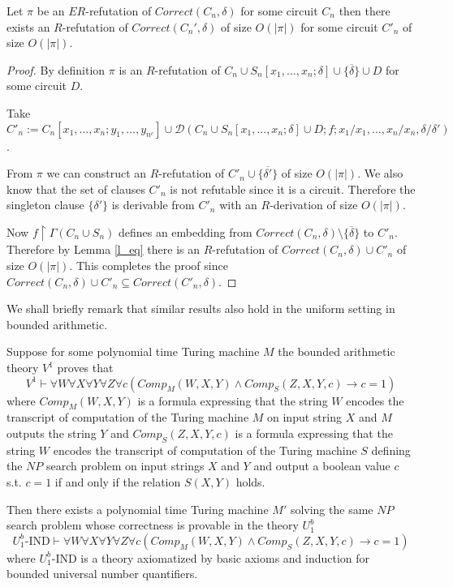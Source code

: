 \documentclass{LMCS}
\theoremstyle{plain}\newtheorem{satz}[thm]{Satz}
\begin{document}
\begin{lem}
\label{t_c}
Let $\pi$ be an $ER$-refutation of $Correct(C_n,\delta)$ for some circuit $C_n$ then there exists an $R$-refutation of $Correct(C_n',\delta)$ of size $O(|\pi|)$ for some circuit $C'_n$ of size $O(|\pi|)$.
\end{lem}
\begin{proof}
By definition $\pi$ is an $R$-refutation of $C_n \cup S_n [x_1,...,x_n;\delta] \cup \{\overline{\delta}\} \cup D$ for some circuit $D$.

Take $C'_n := C_n[x_1,...,x_n;y_1,...,y_{n^c}] \cup {\mathcal D}(C_n \cup S_n [x_1,...,x_n;\delta] \cup D;f;x_1/x_1,...,x_n/x_n,\delta/\delta')$.

From $\pi$ we can construct an $R$-refutation of $C'_n \cup \{ \overline{\delta'}\}$ of size $O(|\pi|)$. We also know that the set of clauses $C'_n$ is not refutable since it is a circuit. Therefore the singleton clause $\{\delta'\}$ is derivable from $C'_n$ with an $R$-derivation of size $O(|\pi|)$.

Now $f \restriction \Gamma(C_n \cup S_n)$ defines an embedding from $Correct(C_n,\delta) \setminus \{ \overline{\delta} \}$ to $C'_n$. Therefore by Lemma \ref{l_eq} there is an $R$-refutation of $Correct(C_n,\delta) \cup C'_n$ of size $O(|\pi|)$. This completes the proof since $Correct(C_n,\delta) \cup C'_ n \subseteq Correct(C'_n,\delta)$.
\end{proof}

We shall briefly remark that similar results also hold in the uniform setting in bounded arithmetic.

Suppose for some polynomial time Turing machine $M$ the bounded arithmetic theory $V^1$ proves that
\begin{equation*}
V^1 \vdash \forall W \forall X \forall Y \forall Z \forall c (Comp_M(W,X,Y) \land Comp_S(Z,X,Y,c) \to c=1)
\end{equation*}
where $Comp_M(W,X,Y)$ is a formula expressing that the string $W$ encodes the transcript of computation of the Turing machine $M$ on input string $X$ and $M$ outputs the string $Y$ and $Comp_S(Z,X,Y,c)$ is a formula expressing that the string $W$ encodes the transcript of computation of the Turing machine $S$ defining the $NP$ search problem on input strings $X$ and $Y$ and output a boolean value $c$ s.t. $c=1$ if and only if the relation $S(X,Y)$ holds.

Then there exists a polynomial time Turing machine $M'$ solving the same $NP$ search problem whose correctness is provable in the theory $U^b_1$
\begin{equation*}
U^b_1\text{-IND} \vdash \forall W \forall X \forall Y \forall Z \forall c (Comp_M(W,X,Y) \land Comp_S(Z,X,Y,c) \to c=1)
\end{equation*}
where $U^b_1$-IND is a theory axiomatized by basic axioms and induction for bounded universal number quantifiers.
\end{document}
